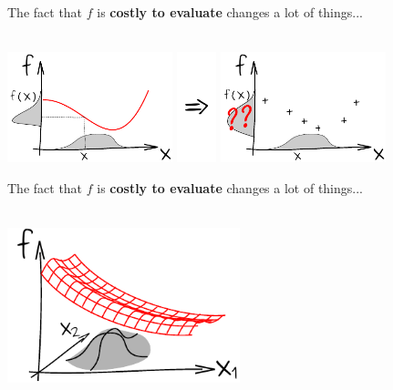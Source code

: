 \begin{frame}{}
The fact that $f$ is \textbf{costly to evaluate} changes a lot of things...\\
\vspace{5mm}
\\
\vspace{5mm}
\begin{center}
\includegraphics[height=3.2cm]{1_stat_models/figures/ink_unprogf} \includegraphics[height=3.2cm]{1_stat_models/figures/Rightarrow} \includegraphics[height=3.2cm]{1_stat_models/figures/ink_unprogfX}
\end{center}
\end{frame}

\begin{frame}{}
The fact that $f$ is \textbf{costly to evaluate} changes a lot of things...\\
\vspace{5mm}
\\
\vspace{5mm}
\begin{center}
\includegraphics[height=4.5cm]{1_stat_models/figures/ink_as}
\end{center}
\end{frame}


